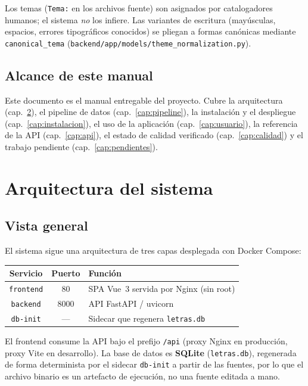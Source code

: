 \documentclass[11pt,letterpaper,twoside]{report}
\newcommand{\codigo}[1]{\texttt{#1}}
\begin{document}
Los temas (\codigo{Tema:} en los archivos fuente) son asignados por
catalogadores humanos; el sistema \emph{no} los infiere. Las variantes
de escritura (mayúsculas, espacios, errores tipográficos conocidos) se
pliegan a formas canónicas mediante \codigo{canonical_tema}
(\codigo{backend/app/models/theme_normalization.py}).

\section{Alcance de este manual}
Este documento es el manual entregable del proyecto. Cubre la
arquitectura (cap.~\ref{cap:arquitectura}), el pipeline de datos
(cap.~\ref{cap:pipeline}), la instalación y el despliegue
(cap.~\ref{cap:instalacion}), el uso de la aplicación
(cap.~\ref{cap:usuario}), la referencia de la API
(cap.~\ref{cap:api}), el estado de calidad verificado
(cap.~\ref{cap:calidad}) y el trabajo pendiente
(cap.~\ref{cap:pendientes}).

\chapter{Arquitectura del sistema}
\label{cap:arquitectura}

\section{Vista general}
El sistema sigue una arquitectura de tres capas desplegada con
Docker Compose:

\begin{center}
\begin{tabular}{ccl}
  \toprule
  \textbf{Servicio} & \textbf{Puerto} & \textbf{Función} \\
  \midrule
  \codigo{frontend} & 80   & SPA Vue~3 servida por Nginx (sin root) \\
  \codigo{backend}  & 8000 & API FastAPI / uvicorn \\
  \codigo{db-init}  & ---  & Sidecar que regenera \codigo{letras.db} \\
  \bottomrule
\end{tabular}
\end{center}

El frontend consume la API bajo el prefijo \codigo{/api} (proxy Nginx en
producción, proxy Vite en desarrollo). La base de datos es
\textbf{SQLite} (\codigo{letras.db}), regenerada de forma determinista
por el sidecar \codigo{db-init} a partir de las fuentes, por lo que el
archivo binario es un artefacto de ejecución, no una fuente editada a
mano.
\end{document}
